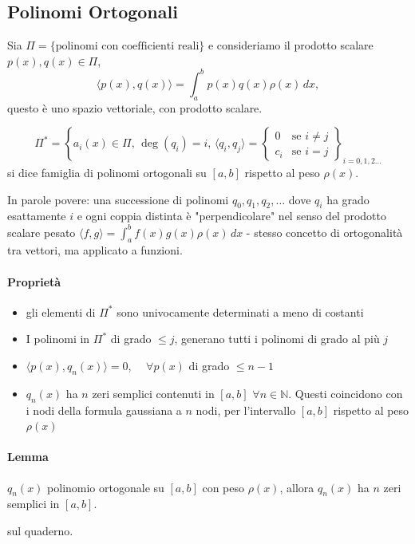 \documentclass[12pt,a4paper,]{report}
\begin{document}
\subsection{Polinomi Ortogonali}
\begin{definizione}
    Sia $\Pi = \{\text{polinomi con coefficienti reali}\}$ e consideriamo il prodotto scalare
    $p(x), q(x) \in \Pi$,
    \[
    \langle p(x), q(x) \rangle = \int_{a}^{b} p(x)q(x)\rho(x)\,dx,
    \]
    questo è uno spazio vettoriale, con prodotto scalare.
\end{definizione}
\begin{definizione}
    \[
    \Pi^* = \left\{ a_i(x) \in \Pi,\, \deg(q_i) = i,\,
    \langle q_i, q_j \rangle =
    \begin{cases} 0 & \text{se } i \neq j \\ c_i & \text{se } i = j \end{cases}
    \right\}_{\!i=0,1,2\ldots}
    \]
    si dice famiglia di polinomi ortogonali su $[a, b]$ rispetto al peso $\rho(x)$.

    In parole povere: una successione di polinomi $q_0, q_1, q_2, \ldots$ dove $q_i$ ha grado esattamente $i$ e ogni coppia distinta è "perpendicolare" nel senso del prodotto scalare pesato $\langle f, g \rangle = \int_a^b f(x)g(x)\rho(x)\,dx$ - stesso concetto di ortogonalità tra vettori, ma applicato a funzioni.
\end{definizione}

\paragraph{Proprietà}
\begin{itemize}
  \item gli elementi di $\Pi^*$ sono univocamente determinati a meno di costanti
  \item I polinomi in $\Pi^*$ di grado $\leq j$, generano tutti i polinomi di grado al più $j$
  \item $\langle p(x), q_n(x) \rangle = 0$, $\quad \forall p(x)$ di grado $\leq n-1$
  \item $q_n(x)$ ha $n$ zeri semplici contenuti in $[a, b]$ $\forall n \in \mathbb{N}$.
        Questi coincidono con i nodi della formula gaussiana a $n$ nodi,
        per l'intervallo $[a, b]$ rispetto al peso $\rho(x)$
\end{itemize}

\paragraph{Lemma}
$q_n(x)$ polinomio ortogonale su $[a, b]$ con peso $\rho(x)$,
allora $q_n(x)$ ha $n$ zeri semplici in $[a, b]$.
\begin{dimostrazionelibera}
    sul quaderno.
\end{dimostrazionelibera}
\end{document}
